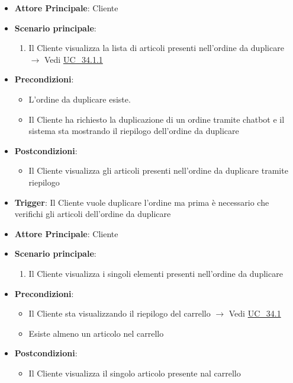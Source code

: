 \begin{itemize}
    \item \textbf{Attore Principale}: Cliente
    \item \textbf{Scenario principale}:
    \begin{enumerate}
        \item Il Cliente visualizza la lista di articoli presenti nell'ordine da duplicare $\rightarrow$ Vedi \hyperref[uc_34.1.1]{UC\_34.1.1}
    \end{enumerate}
    \item \textbf{Precondizioni}:
    \begin{itemize}
        \item L'ordine da duplicare esiste.
        \item Il Cliente ha richiesto la duplicazione di un ordine tramite chatbot e il sistema sta mostrando il riepilogo dell'ordine da duplicare
    \end{itemize}
    \item \textbf{Postcondizioni}:
    \begin{itemize}
        \item Il Cliente visualizza gli articoli presenti nell'ordine da duplicare tramite riepilogo
    \end{itemize}
    \item \textbf{Trigger}: Il Cliente vuole duplicare l'ordine ma prima è necessario che verifichi gli articoli dell'ordine da duplicare
\end{itemize}

\label{uc_34.1.1}

\begin{itemize}
    \item \textbf{Attore Principale}: Cliente
	\item \textbf{Scenario principale}: 
	\begin{enumerate}
		\item Il Cliente visualizza i singoli elementi presenti nell'ordine da duplicare
	\end{enumerate}
	\item \textbf{Precondizioni}: 
	\begin{itemize}
		\item Il Cliente sta visualizzando il riepilogo del carrello $\rightarrow$ Vedi \hyperref[uc_34.1]{UC\_34.1}
		\item Esiste almeno un articolo nel carrello
	\end{itemize}
	\item \textbf{Postcondizioni}:
	\begin{itemize}
		\item Il Cliente visualizza il singolo articolo presente nal carrello
	\end{itemize}
\end{itemize}


